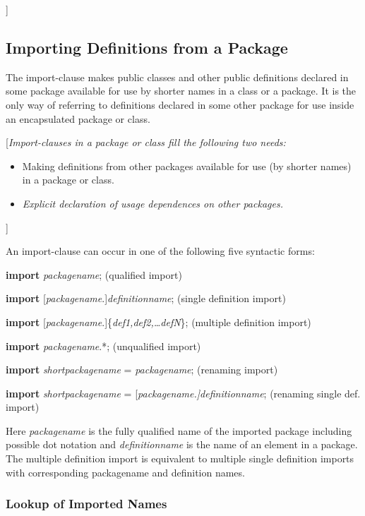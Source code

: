 {]}

\subsection{Importing Definitions from a Package}

The import-clause makes public classes and other public definitions
declared in some package available for use by shorter names in a class
or a package. It is the only way of referring to definitions declared in
some other package for use inside an encapsulated package or class.

{[}\emph{Import-clauses in a package or class fill the following two
needs:}

\begin{itemize}
\item
  Making definitions from other packages available for use (by shorter
  names) in a package or class.
\item
  \emph{Explicit declaration of usage dependences on other packages.}
\end{itemize}

{]}

An import-clause can occur in one of the following five syntactic forms:

\textbf{import} \emph{packagename}; (qualified import)

\textbf{import} {[}\emph{packagename}.{]}\emph{definitionname}; (single
definition import)

\textbf{import}
{[}\emph{packagename}.{]}\{\emph{def1,def2,\ldots{}defN}\}; (multiple
definition import)

\textbf{import} \emph{packagename}.*; (unqualified import)

\textbf{import} \emph{shortpackagename} = \emph{packagename}; (renaming
import)

\textbf{import} \emph{shortpackagename} =
{[}\emph{packagename.{]}definitionname}; (renaming single def. import)

Here \emph{packagename} is the fully qualified name of the imported
package including possible dot notation and \emph{definitionname} is the
name of an element in a package. The multiple definition import is
equivalent to multiple single definition imports with corresponding
packagename and definition names.

\subsubsection{Lookup of Imported Names}


